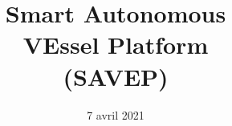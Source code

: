 \documentclass[10pt,french]{beamer}
\title
[]
{\fontsize{11.9}{11.9}\selectfont Smart Autonomous \\VEssel Platform \\ (SAVEP)}
\author
[Projets R\&D]
{}
\institute
[Audensiel Sud-Est]%
{Audensiel Recherche \& Développement}
\date{7 avril 2021}
\begin{document}
\mytitlepage


%

\end{document}
